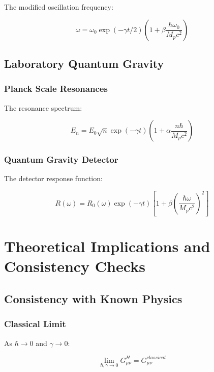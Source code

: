 \documentclass[12pt]{article}
\theoremstyle{plain}
\theoremstyle{definition}
\theoremstyle{remark}
\begin{document}
The modified oscillation frequency:

\begin{equation}
\omega = \omega_0\exp(-\gamma t/2)\left(1 + \beta\frac{\hbar\omega_0}{M_pc^2}\right)
\end{equation}

\subsection{Laboratory Quantum Gravity}

\subsubsection{Planck Scale Resonances}

The resonance spectrum:

\begin{equation}
E_n = E_0\sqrt{n}\exp(-\gamma t)\left(1 + \alpha\frac{n\hbar}{M_pc^2}\right)
\end{equation}

\subsubsection{Quantum Gravity Detector}

The detector response function:

\begin{equation}
R(\omega) = R_0(\omega)\exp(-\gamma t)\left[1 + \beta\left(\frac{\hbar\omega}{M_pc^2}\right)^2\right]
\end{equation}

\section{Theoretical Implications and Consistency Checks}

\subsection{Consistency with Known Physics}

\subsubsection{Classical Limit}

As $\hbar \to 0$ and $\gamma \to 0$:

\begin{equation}
\lim_{\hbar,\gamma \to 0} G_{\mu\nu}^H = G_{\mu\nu}^{classical}
\end{equation}
\end{document}
